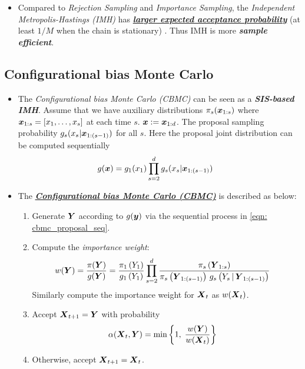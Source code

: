 \documentclass[11pt]{article}
\begin{document}
\begin{itemize}
\item Compared to \emph{Rejection Sampling} and \emph{Importance Sampling}, the \emph{Independent Metropolis-Hastings (IMH)} has   \underline{\emph{\textbf{larger expected acceptance probability}}} (at least $1/M$ when the chain is stationary) \citep{robert1999monte}. Thus IMH is more \textbf{\emph{sample efficient}}.
\end{itemize}
\subsection{Configurational bias Monte Carlo}
\begin{itemize}
\item The \emph{Configurational bias Monte Carlo (CBMC)} can be seen as a \emph{\textbf{SIS-based IMH}}. Assume that we have auxiliary distributions $\pi_s(\boldsymbol{x}_{1:s})$ where $\boldsymbol{x}_{1:s} = [x_1,\ldots, x_s]$ at each time $s$. $\boldsymbol{x}:= \boldsymbol{x}_{1:d}$. The proposal sampling probability $g_s(x_s| \boldsymbol{x}_{1:(s-1)})$ for all $s$. Here the proposal joint distribution can be computed sequentially
\begin{align}
g(\boldsymbol{x}) &= g_{1}(x_1)\prod_{s=2}^{d}g_s(x_s| \boldsymbol{x}_{1:(s-1)}) \label{eqn: cbmc_proposal_seq}
\end{align}

\item The \underline{\emph{\textbf{Configurational bias Monte Carlo (CBMC)}}} is described as below:
\begin{enumerate}
\item Generate $\boldsymbol{Y}$ according to  $g(\boldsymbol{y})$ via the sequential process in \eqref{eqn: cbmc_proposal_seq}.
\item Compute the \emph{importance weight}:
\begin{align}
w(\boldsymbol{Y}) &= \frac{\pi(\boldsymbol{Y})}{g(\boldsymbol{Y})} =\frac{\pi_1\left(Y_1\right)}{g_1\left(Y_1\right)}\prod_{s=2}^{d}\frac{\pi_s\left(\boldsymbol{Y}_{1:s}\right)}{\pi_s\left(\boldsymbol{Y}_{1:(s-1)}\right)\,g_s\left(Y_s\,|\, \boldsymbol{Y}_{1:(s-1)}\right)} \label{eqn: cbmc_importance_weight}
\end{align} Similarly compute the importance weight for $\boldsymbol{X}_{t}$ as $w(\boldsymbol{X}_t)$.
\item Accept $\boldsymbol{X}_{t+1} = \boldsymbol{Y}$ with probability 
\begin{align*}
\alpha(\boldsymbol{X}_{t}, \boldsymbol{Y}) &= \min\left\{1,\;\frac{w(\boldsymbol{Y})}{w(\boldsymbol{X}_t)}\right\}
\end{align*}
\item Otherwise, accept $\boldsymbol{X}_{t+1} = \boldsymbol{X}_{t}$.
\end{enumerate}


\end{itemize}
\end{document}
